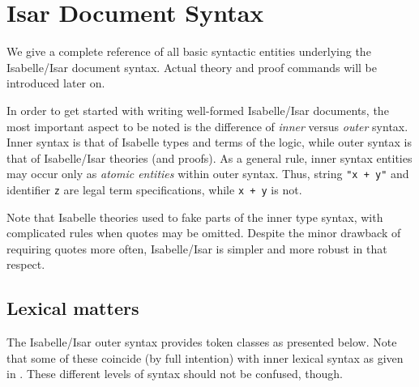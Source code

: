 
\chapter{Isar Document Syntax}

We give a complete reference of all basic syntactic entities underlying the
Isabelle/Isar document syntax.  Actual theory and proof commands will be
introduced later on.

\medskip

In order to get started with writing well-formed Isabelle/Isar documents, the
most important aspect to be noted is the difference of \emph{inner} versus
\emph{outer} syntax.  Inner syntax is that of Isabelle types and terms of the
logic, while outer syntax is that of Isabelle/Isar theories (and proofs).  As
a general rule, inner syntax entities may occur only as \emph{atomic entities}
within outer syntax.  Thus, string \texttt{"x + y"} and identifier \texttt{z}
are legal term specifications, while \texttt{x + y} is not.

\begin{warn}
  Note that Isabelle theories used to fake parts of the inner type syntax,
  with complicated rules when quotes may be omitted.  Despite the minor
  drawback of requiring quotes more often, Isabelle/Isar is simpler and more
  robust in that respect.
\end{warn}


\section{Lexical matters}\label{sec:lex-syntax}

The Isabelle/Isar outer syntax provides token classes as presented below.
Note that some of these coincide (by full intention) with inner lexical syntax
as given in \cite{isabelle-ref}.  These different levels of syntax should not
be confused, though.

